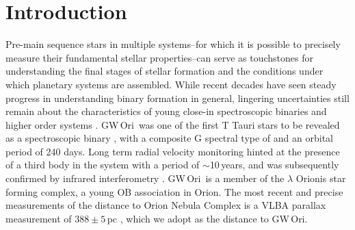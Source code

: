 \documentclass[twocolumn]{aastex61}
\newcommand{\todo}[1]{ \textcolor{red}{#1}}
\newcommand{\gw}{GW\,Ori}
\newcommand{\obj}{\gw}
\newcommand{\thirteen}{${}^{13}$CO}
\newcommand{\eighteen}{C${}^{18}$O}
\begin{document}
\begin{abstract}
We present spatially and spectrally resolved Atacama Large Millimeter/submillimeter Array (ALMA) observations of gas and dust in the disk orbiting the pre-main sequence triple GW Ori. We forward-model the \thirteen\ and \eighteen\ $J$=2--1 transitions to put precise constraint on the total stellar mass of $5.29 \pm 0.09\,M_\odot$, and disk inclination of $i_\mathrm{disk} = 137.6 \pm 2.0^\circ$. We use 35 years of optical radial velocity monitoring and spectroscopic dentangling techniques to reveal \obj\ as a near equal-flux double-lined spectroscopic binary. Combining the measurements from these two datasets yields a precise constraint on the stellar masses of \todo{XX}. We publish a light curve with a 30-year baseline that shows several eclipse events. We show that this precise mass is consistent with the predictions of leading pre-main sequence evolutionary models based upon its observed photospheric properties. We put constraints on the orbital configuration of the triple system within the massive disk and discuss this in the context of star and planet formation.
\end{abstract}

\section{Introduction} \label{sec:intro}

Pre-main sequence stars in multiple systems--for which it is possible to precisely measure their fundamental stellar properties--can serve as touchstones for understanding the final stages of stellar formation and the conditions under which planetary systems are assembled. While recent decades have seen steady progress in understanding binary formation in general, lingering uncertainties still remain about the characteristics of young close-in spectroscopic binaries and higher order systems \citep{duchene13}.
\gw\ was one of the first T Tauri stars to be revealed as a spectroscopic binary \citep{mathieu91}, with a composite G spectral type of and an orbital period of 240 days. Long term radial velocity monitoring hinted at the presence of a third body in the system with a period of $\sim$10\,years, and was subsequently confirmed by infrared interferometry \citep{berger11}. \gw\ is a member of the $\lambda$ Orionis star forming complex, a young OB association \citep{dolan00,dolan01,dolan02} in Orion. The most recent and precise measurements of the distance to Orion Nebula Complex is a VLBA parallax measurement of $388\pm5\,$pc \citep{kounkel17}, which we adopt as the distance to \gw.
\end{document}

